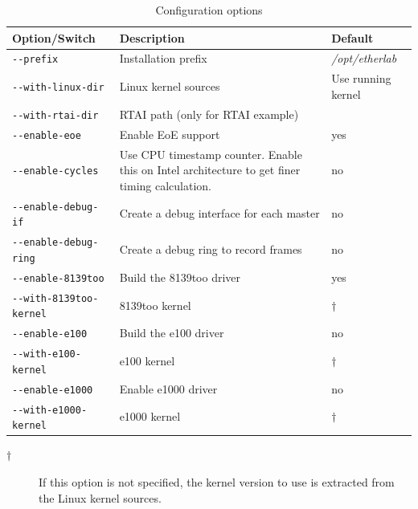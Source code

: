 \documentclass[a4paper,12pt,BCOR6mm,bibtotoc,idxtotoc]{scrbook}
\begin{document}
\begin{table}
  \caption{Configuration options}
  \label{tab:config}
  \vspace{2mm}
  \begin{tabular}{l|p{}|l}

\bf Option/Switch & \bf Description & \bf Default\\\hline

\lstinline+--prefix+ & Installation prefix & \textit{/opt/etherlab}\\

\lstinline+--with-linux-dir+ & Linux kernel sources & Use running kernel\\

\lstinline+--with-rtai-dir+ & RTAI path (only for RTAI example) & \\

\hline

\lstinline+--enable-eoe+ & Enable EoE support & yes\\

\lstinline+--enable-cycles+ & Use CPU timestamp counter. Enable this on Intel
architecture to get finer timing calculation. & no\\

\lstinline+--enable-debug-if+ & Create a debug interface for each master & no\\

\lstinline+--enable-debug-ring+ & Create a debug ring to record frames & no\\

\hline

\lstinline+--enable-8139too+ & Build the 8139too driver & yes\\

\lstinline+--with-8139too-kernel+ & 8139too kernel & $\dagger$\\

\lstinline+--enable-e100+ & Build the e100 driver & no\\

\lstinline+--with-e100-kernel+ & e100 kernel & $\dagger$\\

\lstinline+--enable-e1000+ & Enable e1000 driver & no\\

\lstinline+--with-e1000-kernel+ & e1000 kernel & $\dagger$\\

  \end{tabular}
  \vspace{2mm}

\begin{description}

\item[$\dagger$] If this option is not specified, the kernel version to use is
extracted from the Linux kernel sources.

\end{description}

\end{table}
\end{document}
